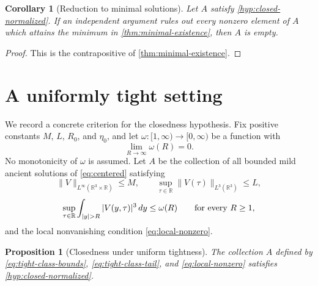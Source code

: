\documentclass[11pt]{amsart}
\theoremstyle{plain}
\newtheorem{proposition}[theorem]{Proposition}
\newtheorem{corollary}[theorem]{Corollary}
\theoremstyle{definition}
\theoremstyle{remark}
\numberwithin{equation}{section}
\begin{document}
\begin{corollary}[Reduction to minimal solutions]\label{cor:minimal-reduction}
Let \(A\) satisfy \cref{hyp:closed-normalized}.  If an independent argument
rules out every nonzero element of \(A\) which attains the minimum in
\cref{thm:minimal-existence}, then \(A\) is empty.
\end{corollary}

\begin{proof}
This is the contrapositive of \cref{thm:minimal-existence}.
\end{proof}

\section{A uniformly tight setting}

We record a concrete criterion for the closedness hypothesis.  Fix positive
constants \(M\), \(L\), \(R_0\), and \(\eta_0\), and let
\(\omega:[1,\infty)\to[0,\infty)\) be a function with
\[
   \lim_{R\to\infty}\omega(R)=0 .
\]
No monotonicity of \(\omega\) is assumed.
Let \(A\) be the collection of all bounded mild ancient solutions of
\eqref{eq:centered} satisfying
\begin{equation}\label{eq:tight-class-bounds}
   \|V\|_{L^\infty(\mathbb R^3\times\mathbb R)}\le M,
   \qquad
   \sup_{\tau\in\mathbb R}\|V(\tau)\|_{L^3(\mathbb R^3)}\le L,
\end{equation}
\begin{equation}\label{eq:tight-class-tail}
   \sup_{\tau\in\mathbb R}
   \int_{|y|>R}|V(y,\tau)|^3\,dy\le\omega(R)
   \qquad\hbox{for every }R\ge1,
\end{equation}
and the local nonvanishing condition \eqref{eq:local-nonzero}.

\begin{proposition}[Closedness under uniform tightness]\label{prop:tight-closed}
The collection \(A\) defined by \eqref{eq:tight-class-bounds},
\eqref{eq:tight-class-tail}, and \eqref{eq:local-nonzero} satisfies
\cref{hyp:closed-normalized}.
\end{proposition}
\end{document}
